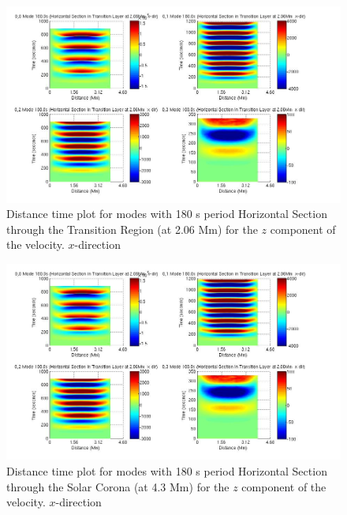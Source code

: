 \documentclass[authoryear,final,1p]{elsarticle}
\begin{document}
\begin{figure}[h]
\includegraphics[scale=0.5]{imagesn/dt_180_horiz_x_2p06Mm.jpg}
\caption{Distance time plot for modes with 180 s period Horizontal Section through the Transition Region (at 2.06 Mm) for the $z$  component of the velocity. $x$-direction}
\end{figure}

\begin{figure}[h]
\includegraphics[scale=0.5]{imagesn/dt_180_horiz_x_2p06Mm.jpg}
\caption{Distance time plot for modes with 180 s period Horizontal Section through the Solar Corona (at 4.3 Mm) for the $z$ component of the velocity. $x$-direction}
\end{figure}
\end{document}
